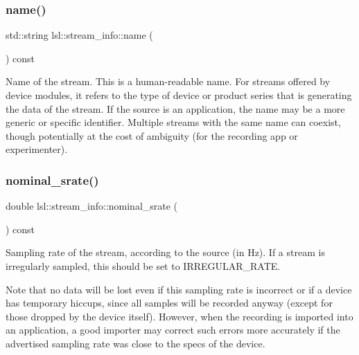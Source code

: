 \subsubsection{\texorpdfstring{name()}{name()}}
{\footnotesize\ttfamily std\+::string lsl\+::stream\+\_\+info\+::name (\begin{DoxyParamCaption}{ }\end{DoxyParamCaption}) const\hspace{0.3cm}{\ttfamily [inline]}}

Name of the stream. This is a human-\/readable name. For streams offered by device modules, it refers to the type of device or product series that is generating the data of the stream. If the source is an application, the name may be a more generic or specific identifier. Multiple streams with the same name can coexist, though potentially at the cost of ambiguity (for the recording app or experimenter). \mbox{\label{classlsl_1_1stream__info_a35b9b9b8947915f9f9518333342e2835}} 
\subsubsection{\texorpdfstring{nominal\+\_\+srate()}{nominal\_srate()}}
{\footnotesize\ttfamily double lsl\+::stream\+\_\+info\+::nominal\+\_\+srate (\begin{DoxyParamCaption}{ }\end{DoxyParamCaption}) const\hspace{0.3cm}{\ttfamily [inline]}}

Sampling rate of the stream, according to the source (in Hz). If a stream is irregularly sampled, this should be set to I\+R\+R\+E\+G\+U\+L\+A\+R\+\_\+\+R\+A\+TE.

Note that no data will be lost even if this sampling rate is incorrect or if a device has temporary hiccups, since all samples will be recorded anyway (except for those dropped by the device itself). However, when the recording is imported into an application, a good importer may correct such errors more accurately if the advertised sampling rate was close to the specs of the device. \mbox{\label{classlsl_1_1stream__info_a8ce8011b9da9b90c8e11e5c1c477a0a2}} 
